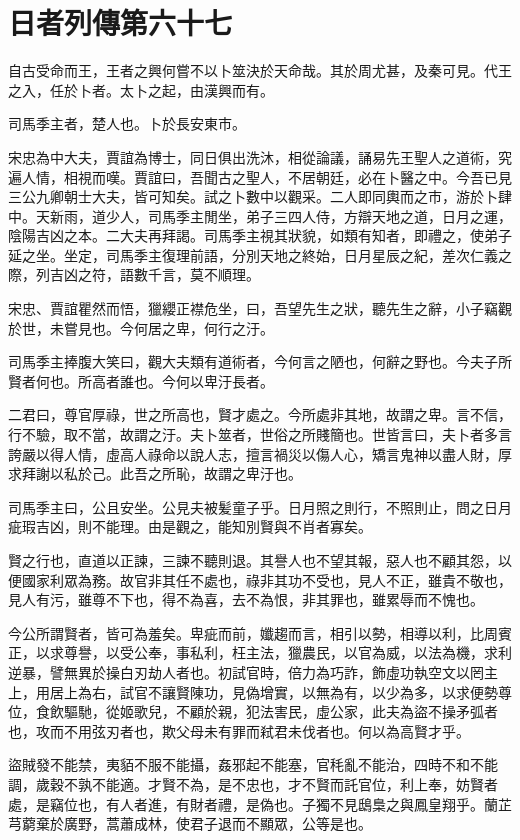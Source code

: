 \chapter{日者列傳第六十七}

自古受命而王，王者之興何嘗不以卜筮決於天命哉。其於周尤甚，及秦可見。代王之入，任於卜者。太卜之起，由漢興而有。

司馬季主者，楚人也。卜於長安東市。

宋忠為中大夫，賈誼為博士，同日俱出洗沐，相從論議，誦易先王聖人之道術，究遍人情，相視而嘆。賈誼曰，吾聞古之聖人，不居朝廷，必在卜醫之中。今吾已見三公九卿朝士大夫，皆可知矣。試之卜數中以觀采。二人即同輿而之市，游於卜肆中。天新雨，道少人，司馬季主閒坐，弟子三四人侍，方辯天地之道，日月之運，陰陽吉凶之本。二大夫再拜謁。司馬季主視其狀貌，如類有知者，即禮之，使弟子延之坐。坐定，司馬季主復理前語，分別天地之終始，日月星辰之紀，差次仁義之際，列吉凶之符，語數千言，莫不順理。

宋忠、賈誼瞿然而悟，獵纓正襟危坐，曰，吾望先生之狀，聽先生之辭，小子竊觀於世，未嘗見也。今何居之卑，何行之汙。

司馬季主捧腹大笑曰，觀大夫類有道術者，今何言之陋也，何辭之野也。今夫子所賢者何也。所高者誰也。今何以卑汙長者。

二君曰，尊官厚祿，世之所高也，賢才處之。今所處非其地，故謂之卑。言不信，行不驗，取不當，故謂之汙。夫卜筮者，世俗之所賤簡也。世皆言曰，夫卜者多言誇嚴以得人情，虛高人祿命以說人志，擅言禍災以傷人心，矯言鬼神以盡人財，厚求拜謝以私於己。此吾之所恥，故謂之卑汙也。

司馬季主曰，公且安坐。公見夫被髪童子乎。日月照之則行，不照則止，問之日月疵瑕吉凶，則不能理。由是觀之，能知別賢與不肖者寡矣。

賢之行也，直道以正諫，三諫不聽則退。其譽人也不望其報，惡人也不顧其怨，以便國家利眾為務。故官非其任不處也，祿非其功不受也，見人不正，雖貴不敬也，見人有污，雖尊不下也，得不為喜，去不為恨，非其罪也，雖累辱而不愧也。

今公所謂賢者，皆可為羞矣。卑疵而前，孅趨而言，相引以勢，相導以利，比周賓正，以求尊譽，以受公奉，事私利，枉主法，獵農民，以官為威，以法為機，求利逆暴，譬無異於操白刃劫人者也。初試官時，倍力為巧詐，飾虛功執空文以罔主上，用居上為右，試官不讓賢陳功，見偽增實，以無為有，以少為多，以求便勢尊位，食飲驅馳，從姬歌兒，不顧於親，犯法害民，虛公家，此夫為盜不操矛弧者也，攻而不用弦刃者也，欺父母未有罪而弒君未伐者也。何以為高賢才乎。

盜賊發不能禁，夷貊不服不能攝，姦邪起不能塞，官秏亂不能治，四時不和不能調，歲穀不孰不能適。才賢不為，是不忠也，才不賢而託官位，利上奉，妨賢者處，是竊位也，有人者進，有財者禮，是偽也。子獨不見鴟梟之與鳳皇翔乎。蘭芷芎藭棄於廣野，蒿蕭成林，使君子退而不顯眾，公等是也。

